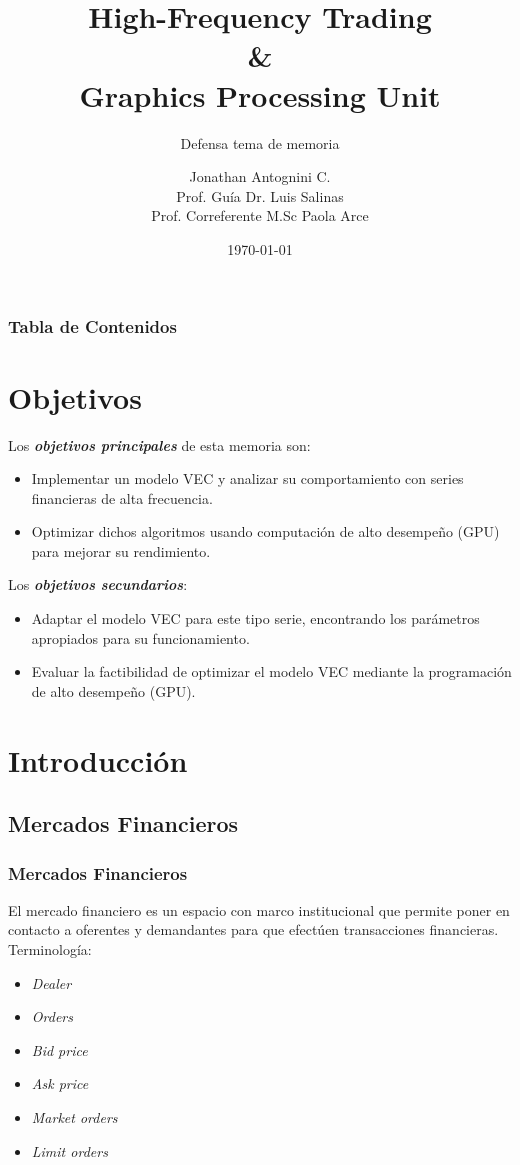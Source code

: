 \documentclass{beamer}
\title{High-Frequency Trading \\ \& \\ Graphics Processing Unit}
\subtitle{Defensa tema de memoria}
\author{Jonathan Antognini C.\\
		Prof. Guía Dr. Luis Salinas\\
        Prof. Correferente M.Sc Paola Arce}
\institute[UTFSM]{Universidad Técnica Federico Santa María}
\date{\today}
\begin{document}
    \frame{\titlepage}
    \begin{frame}{\contentsname}
        \frametitle{Tabla de Contenidos} 
        \begin{multicols}{2}
        \tableofcontents
        \end{multicols}
    \end{frame}

    \section{Objetivos}
        \begin{frame}
            \noindent Los \emph{\textbf{objetivos principales}} de esta memoria son:
            \begin{itemize}
             \item Implementar un modelo VEC y analizar su comportamiento con
            series financieras de alta frecuencia.
             \item Optimizar dichos algoritmos usando computación de alto desempeño
            (GPU) para mejorar su rendimiento.
            \end{itemize}
            
            \noindent Los \emph{\textbf{objetivos secundarios}}:
            \begin{itemize}
                \item Adaptar el modelo VEC para este tipo serie, encontrando
            los parámetros apropiados para su funcionamiento.
                \item Evaluar la factibilidad de optimizar el modelo VEC mediante la
            programación de alto desempeño (GPU).
            \end{itemize}

        \end{frame}
	
    \section{Introducción}
        \subsection{Mercados Financieros}
            \begin{frame}
            \frametitle{Mercados Financieros}
                El mercado financiero es un espacio con marco institucional que
                permite poner en contacto a oferentes y demandantes para que efectúen
                transacciones financieras. Terminología:
                \begin{itemize}
                    \item \emph{Dealer}
                    \item \emph{Orders}
                    \item \emph{Bid price}
                    \item \emph{Ask price}
                    \item \emph{Market orders}
                    \item \emph{Limit orders}
                \end{itemize}
            \end{frame}
\end{document}
